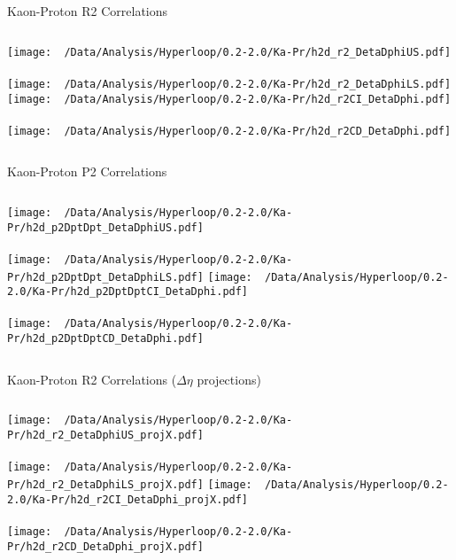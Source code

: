\documentclass{beamer}
\begin{document}
\begin{frame}{Kaon-Proton R2 Correlations}
	\begin{columns}
		\centering
		\texttt{[image: ~/Data/Analysis/Hyperloop/0.2-2.0/Ka-Pr/h2d\_r2\_DetaDphiUS.pdf]}\\~\\
		\texttt{[image: ~/Data/Analysis/Hyperloop/0.2-2.0/Ka-Pr/h2d\_r2\_DetaDphiLS.pdf]}
		\centering
		\texttt{[image: ~/Data/Analysis/Hyperloop/0.2-2.0/Ka-Pr/h2d\_r2CI\_DetaDphi.pdf]}\\~\\
		\texttt{[image: ~/Data/Analysis/Hyperloop/0.2-2.0/Ka-Pr/h2d\_r2CD\_DetaDphi.pdf]}
	\end{columns}
\end{frame}
\begin{frame}{Kaon-Proton P2 Correlations}
	\begin{columns}
		\column{0.5\linewidth}
		\centering
		\texttt{[image: ~/Data/Analysis/Hyperloop/0.2-2.0/Ka-Pr/h2d\_p2DptDpt\_DetaDphiUS.pdf]}\\~\\
		\texttt{[image: ~/Data/Analysis/Hyperloop/0.2-2.0/Ka-Pr/h2d\_p2DptDpt\_DetaDphiLS.pdf]}
		\column{0.5\linewidth}
		\centering
		\texttt{[image: ~/Data/Analysis/Hyperloop/0.2-2.0/Ka-Pr/h2d\_p2DptDptCI\_DetaDphi.pdf]}\\~\\
		\texttt{[image: ~/Data/Analysis/Hyperloop/0.2-2.0/Ka-Pr/h2d\_p2DptDptCD\_DetaDphi.pdf]}
	\end{columns}
\end{frame}
\begin{frame}{Kaon-Proton R2 Correlations ($\Delta\eta$ projections)}
	\begin{columns}
		\centering
		\texttt{[image: ~/Data/Analysis/Hyperloop/0.2-2.0/Ka-Pr/h2d\_r2\_DetaDphiUS\_projX.pdf]}\\~\\
		\texttt{[image: ~/Data/Analysis/Hyperloop/0.2-2.0/Ka-Pr/h2d\_r2\_DetaDphiLS\_projX.pdf]}
		\centering
		\texttt{[image: ~/Data/Analysis/Hyperloop/0.2-2.0/Ka-Pr/h2d\_r2CI\_DetaDphi\_projX.pdf]}\\~\\
		\texttt{[image: ~/Data/Analysis/Hyperloop/0.2-2.0/Ka-Pr/h2d\_r2CD\_DetaDphi\_projX.pdf]}
	\end{columns}
\end{frame}
\end{document}
